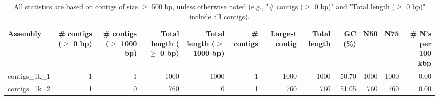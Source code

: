 \documentclass[12pt,a4paper]{article}
\begin{document}
\begin{table}[ht]
\begin{center}
\caption{All statistics are based on contigs of size $\geq$ 500 bp, unless otherwise noted (e.g., "\# contigs ($\geq$ 0 bp)" and "Total length ($\geq$ 0 bp)" include all contigs).}
\begin{tabular}{|l*{11}{|r}|}
\hline
Assembly & \# contigs ($\geq$ 0 bp) & \# contigs ($\geq$ 1000 bp) & Total length ($\geq$ 0 bp) & Total length ($\geq$ 1000 bp) & \# contigs & Largest contig & Total length & GC (\%) & N50 & N75 & \# N's per 100 kbp \\ \hline
contigs\_1k\_1 & 1 & 1 & 1000 & 1000 & 1 & 1000 & 1000 & 50.70 & 1000 & 1000 & 0.00 \\ \hline
contigs\_1k\_2 & 1 & 0 & 760 & 0 & 1 & 760 & 760 & 51.05 & 760 & 760 & 0.00 \\ \hline
\end{tabular}
\end{center}
\end{table}
\end{document}
